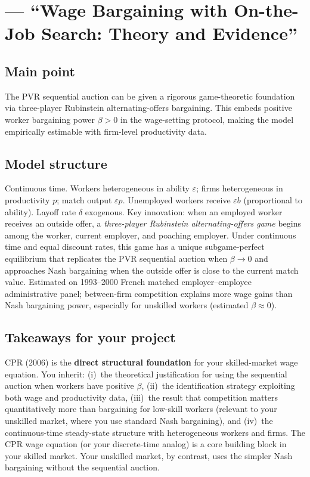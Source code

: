 \documentclass[12pt]{article}
\begin{document}
\section{\citet{cahuc2006} --- ``Wage Bargaining with On-the-Job Search: Theory and Evidence''}

\subsection*{Main point}

The PVR sequential auction can be given a rigorous game-theoretic foundation via three-player Rubinstein alternating-offers bargaining. This embeds positive worker bargaining power $\beta > 0$ in the wage-setting protocol, making the model empirically estimable with firm-level productivity data.

\subsection*{Model structure}

Continuous time. Workers heterogeneous in ability $\varepsilon$; firms heterogeneous in productivity $p$; match output $\varepsilon p$. Unemployed workers receive $\varepsilon b$ (proportional to ability). Layoff rate $\delta$ exogenous. Key innovation: when an employed worker receives an outside offer, a \emph{three-player Rubinstein alternating-offers game} begins among the worker, current employer, and poaching employer. Under continuous time and equal discount rates, this game has a unique subgame-perfect equilibrium that replicates the PVR sequential auction when $\beta \to 0$ and approaches Nash bargaining when the outside offer is close to the current match value. Estimated on 1993--2000 French matched employer--employee administrative panel; between-firm competition explains more wage gains than Nash bargaining power, especially for unskilled workers (estimated $\beta \approx 0$).

\subsection*{Takeaways for your project}

CPR (2006) is the \textbf{direct structural foundation} for your skilled-market wage equation. You inherit: (i)~the theoretical justification for using the sequential auction when workers have positive $\beta$, (ii)~the identification strategy exploiting both wage and productivity data, (iii)~the result that competition matters quantitatively more than bargaining for low-skill workers (relevant to your unskilled market, where you use standard Nash bargaining), and (iv)~the continuous-time steady-state structure with heterogeneous workers and firms. The CPR wage equation (or your discrete-time analog) is a core building block in your skilled market. Your unskilled market, by contrast, uses the simpler Nash bargaining without the sequential auction.
\end{document}
